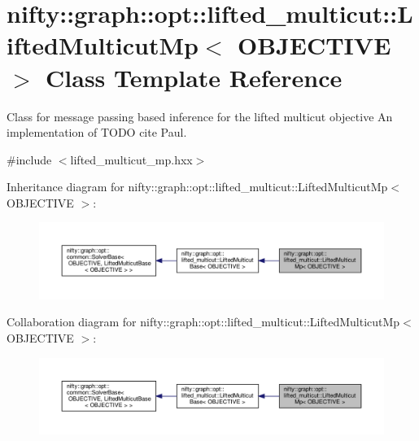 \hypertarget{classnifty_1_1graph_1_1opt_1_1lifted__multicut_1_1LiftedMulticutMp}{}\section{nifty\+:\+:graph\+:\+:opt\+:\+:lifted\+\_\+multicut\+:\+:Lifted\+Multicut\+Mp$<$ O\+B\+J\+E\+C\+T\+I\+VE $>$ Class Template Reference}
\label{classnifty_1_1graph_1_1opt_1_1lifted__multicut_1_1LiftedMulticutMp}


Class for message passing based inference for the lifted multicut objective An implementation of T\+O\+DO cite Paul.  




{\ttfamily \#include $<$lifted\+\_\+multicut\+\_\+mp.\+hxx$>$}



Inheritance diagram for nifty\+:\+:graph\+:\+:opt\+:\+:lifted\+\_\+multicut\+:\+:Lifted\+Multicut\+Mp$<$ O\+B\+J\+E\+C\+T\+I\+VE $>$\+:
\nopagebreak
\begin{figure}[H]
\begin{center}
\leavevmode
\includegraphics[width=350pt]{classnifty_1_1graph_1_1opt_1_1lifted__multicut_1_1LiftedMulticutMp__inherit__graph}
\end{center}
\end{figure}


Collaboration diagram for nifty\+:\+:graph\+:\+:opt\+:\+:lifted\+\_\+multicut\+:\+:Lifted\+Multicut\+Mp$<$ O\+B\+J\+E\+C\+T\+I\+VE $>$\+:
\nopagebreak
\begin{figure}[H]
\begin{center}
\leavevmode
\includegraphics[width=350pt]{classnifty_1_1graph_1_1opt_1_1lifted__multicut_1_1LiftedMulticutMp__coll__graph}
\end{center}
\end{figure}
